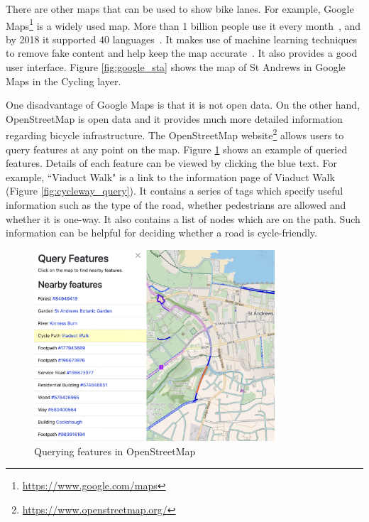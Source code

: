 \documentclass[12pt,a4paper]{report}
\begin{document}
There are other maps that can be used to show bike lanes. For example, Google Maps\footnote{\url{https://www.google.com/maps}} is a widely used map. More than 1 billion people use it every month~\cite{ethan2019}, and by 2018 it supported 40 languages~\cite{yamagami2018}. It makes use of machine learning techniques to remove fake content and help keep the map accurate~\cite{gupta2023}. It also provides a good user interface. Figure \ref{fig:google_sta} shows the map of St Andrews in Google Maps in the Cycling layer.

One disadvantage of Google Maps is that it is not open data. On the other hand, OpenStreetMap is open data and it provides much more detailed information regarding bicycle infrastructure. The OpenStreetMap website\footnote{\url{https://www.openstreetmap.org/}} allows users to query features at any point on the map. Figure \ref{fig:feature_query} shows an example of queried features. Details of each feature can be viewed by clicking the blue text. For example, ``Viaduct Walk" is a link to the information page of Viaduct Walk (Figure \ref{fig:cycleway_query}). It contains a series of tags which specify useful information such as the type of the road, whether pedestrians are allowed and whether it is one-way. It also contains a list of nodes which are on the path. Such information can be helpful for deciding whether a road is cycle-friendly.

\begin{figure}[ht]
\centering
\includegraphics[width=0.8\textwidth]{plan_images/feature.png}
\caption{Querying features in OpenStreetMap}
\label{fig:feature_query}
\end{figure}
\end{document}
